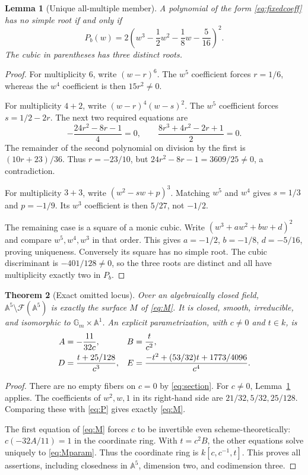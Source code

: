 \documentclass[11pt,a4paper]{article}
\newtheorem{theorem}{Theorem}[section]
\newtheorem{lemma}[theorem]{Lemma}
\theoremstyle{definition}
\newcommand{\A}{\mathbb A}
\newcommand{\Gm}{\mathbb G_m}
\newcommand{\F}{\mathcal F}
\begin{document}
\begin{lemma}[Unique all-multiple member]\label{lem:square}
A polynomial of the form \eqref{eq:fixedcoeff} has no simple root if and
only if
\begin{equation}\label{eq:uniquesquare}
 P_b(w)=2\left(w^3-\frac12w^2-\frac18w-\frac5{16}\right)^2.
\end{equation}
The cubic in parentheses has three distinct roots.
\end{lemma}
\begin{proof}
For multiplicity $6$, write $(w-r)^6$. The $w^5$ coefficient forces
$r=1/6$, whereas the $w^4$ coefficient is then $15r^2\ne0$.

For multiplicity $4+2$, write $(w-r)^4(w-s)^2$. The $w^5$ coefficient
forces $s=1/2-2r$. The next two required equations are
\[
 -\frac{24r^2-8r-1}{4}=0,
 \qquad \frac{8r^3+4r^2-2r+1}{2}=0.
\]
The remainder of the second polynomial on division by the first is
$(10r+23)/36$. Thus $r=-23/10$, but
$24r^2-8r-1=3609/25\ne0$, a contradiction.

For multiplicity $3+3$, write $(w^2-sw+p)^3$. Matching $w^5$ and $w^4$
gives $s=1/3$ and $p=-1/9$. Its $w^3$ coefficient is then $5/27$, not
$-1/2$.

The remaining case is a square of a monic cubic. Write
$(w^3+aw^2+bw+d)^2$ and compare $w^5,w^4,w^3$ in that order. This gives
$a=-1/2$, $b=-1/8$, $d=-5/16$, proving uniqueness. Conversely its square
has no simple root. The cubic discriminant is $-401/128\ne0$, so the
three roots are distinct and all have multiplicity exactly two in $P_b$.
\end{proof}

\begin{theorem}[Exact omitted locus]\label{thm:omitted}
Over an algebraically closed field, $\A^5\setminus\F(\A^5)$ is exactly
the surface $M$ of \eqref{eq:M}. It is closed, smooth, irreducible, and
isomorphic to $\Gm\times\A^1$. An explicit parametrization, with
$c\ne0$ and $t\in k$, is
\begin{align}
 A&=-\frac{11}{32c},& B&=\frac{t}{c^2},\notag\\
 D&=\frac{t+25/128}{c^3},&
 E&=\frac{-t^2+(53/32)t+1773/4096}{c^4}.
 \label{eq:Mparam}
\end{align}
\end{theorem}
\begin{proof}
There are no empty fibers on $c=0$ by \eqref{eq:section}. For $c\ne0$,
Lemma~\ref{lem:square} applies. The coefficients of $w^2,w,1$ in its
right-hand side are $21/32,5/32,25/128$. Comparing these with
\eqref{eq:P} gives exactly \eqref{eq:M}.

The first equation of \eqref{eq:M} forces $c$ to be invertible even
scheme-theoretically: $c(-32A/11)=1$ in the coordinate ring. With
$t=c^2B$, the other equations solve uniquely to \eqref{eq:Mparam}.
Thus the coordinate ring is $k[c,c^{-1},t]$. This proves all assertions,
including closedness in $\A^5$, dimension two, and codimension three.
\end{proof}
\end{document}
